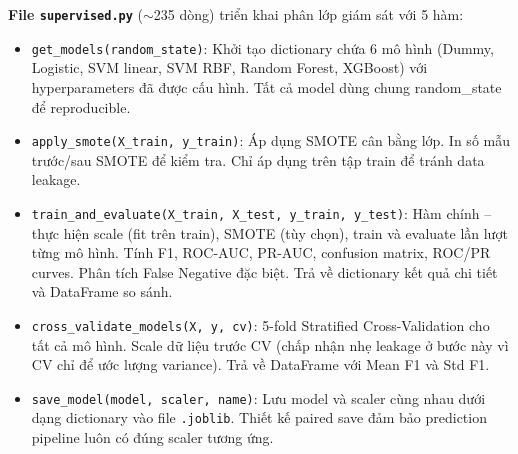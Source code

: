 \textbf{File \texttt{supervised.py}} ($\sim$235 dòng) triển khai phân lớp giám sát với 5 hàm:
\begin{itemize}
    \item \texttt{get\_models(random\_state)}: Khởi tạo dictionary chứa 6 mô hình (Dummy, Logistic, SVM linear, SVM RBF, Random Forest, XGBoost) với hyperparameters đã được cấu hình. Tất cả model dùng chung random\_state để reproducible.
    \item \texttt{apply\_smote(X\_train, y\_train)}: Áp dụng SMOTE cân bằng lớp. In số mẫu trước/sau SMOTE để kiểm tra. Chỉ áp dụng trên tập train để tránh data leakage.
    \item \texttt{train\_and\_evaluate(X\_train, X\_test, y\_train, y\_test)}: Hàm chính -- thực hiện scale (fit trên train), SMOTE (tùy chọn), train và evaluate lần lượt từng mô hình. Tính F1, ROC-AUC, PR-AUC, confusion matrix, ROC/PR curves. Phân tích False Negative đặc biệt. Trả về dictionary kết quả chi tiết và DataFrame so sánh.
    \item \texttt{cross\_validate\_models(X, y, cv)}: 5-fold Stratified Cross-Validation cho tất cả mô hình. Scale dữ liệu trước CV (chấp nhận nhẹ leakage ở bước này vì CV chỉ để ước lượng variance). Trả về DataFrame với Mean F1 và Std F1.
    \item \texttt{save\_model(model, scaler, name)}: Lưu model và scaler cùng nhau dưới dạng dictionary vào file \texttt{.joblib}. Thiết kế paired save đảm bảo prediction pipeline luôn có đúng scaler tương ứng.
\end{itemize}

